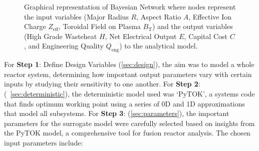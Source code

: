 \documentclass[journal]{IEEEtran}
\begin{document}
\begin{figure}[t]
    \centering
    \caption{\small Graphical representation of Bayesian Network where nodes represent the input variables (Major Radius $R$, Aspect Ratio $A$, Effective Ion Charge $Z_{\text{eff}}$, Toroidal Field on Plasma $B_{\text{T}}$) and the output variables (High Grade Wasteheat $H$, Net Electrical Output $E$, Capital Cost $C$, and Engineering Quality $Q_{\text{eng}}$) to the analytical model.}\label{fig:BN2} 
    \vspace{-15pt}
\end{figure}

For \textbf{Step 1}: Define Design Variables (\ref{sec:design}), the aim was to model a whole reactor system, determining how important output parameters vary with certain inputs by studying their sensitivity to one another. For \textbf{Step 2}: (~\ref{sec:deterministic}), the deterministic  model used was `PyTOK', a systems code that finds optimum working point using a series of 0D and 1D approximations that model all subsystems. For \textbf{Step 3}: (\ref{sec:parameters}), the important parameters for the surrogate model were carefully selected based on insights from the PyTOK model, a comprehensive tool for fusion reactor analysis. The chosen input parameters include: 
\end{document}
